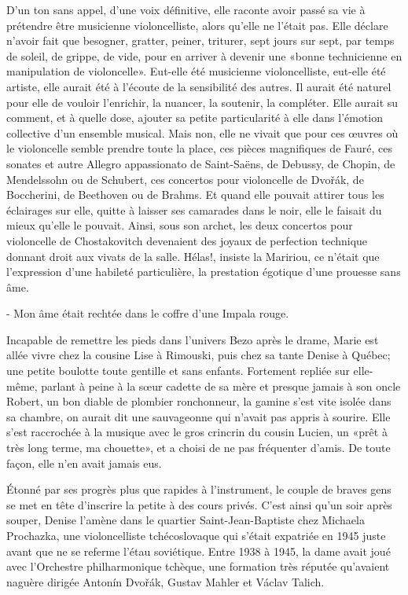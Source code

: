 D’un ton sans appel, d’une voix définitive, elle raconte avoir passé sa vie à prétendre être musicienne violoncelliste, alors qu’elle ne l’était pas. Elle déclare n’avoir fait que besogner, gratter, peiner, triturer, sept jours sur sept, par temps de soleil, de grippe, de vide, pour en arriver à devenir une «bonne technicienne en manipulation de violoncelle». Eut-elle été musicienne violoncelliste, eut-elle été artiste, elle aurait été à l’écoute de la sensibilité des autres. Il aurait été naturel pour elle de vouloir l’enrichir, la nuancer, la soutenir, la compléter. Elle aurait su comment, et à quelle dose, ajouter sa petite particularité à elle dans l’émotion collective d’un ensemble musical. Mais non, elle ne vivait que pour ces œuvres où le violoncelle semble prendre toute la place, ces pièces magnifiques de Fauré, ces sonates et autre Allegro appassionato de Saint-Saëns, de Debussy, de Chopin, de Mendelssohn ou de Schubert, ces concertos pour violoncelle de Dvořák, de Boccherini, de Beethoven ou de Brahms. Et quand elle pouvait attirer tous les éclairages sur elle, quitte à laisser ses camarades dans le noir, elle le faisait du mieux qu’elle le pouvait. Ainsi, sous son archet, les deux concertos pour violoncelle de Chostakovitch devenaient des joyaux de perfection technique donnant droit aux vivats de la salle. Hélas!, insiste la Maririou, ce n’était que l’expression d’une habileté particulière, la prestation égotique d’une prouesse sans âme.

- Mon âme était rechtée dans le coffre d’une Impala rouge.

Incapable de remettre les pieds dans l’univers Bezo après le drame, Marie est allée vivre chez la cousine Lise à Rimouski, puis chez sa tante Denise à Québec; une petite boulotte toute gentille et sans enfants. Fortement repliée sur elle-même, parlant à peine à la sœur cadette de sa mère et presque jamais à son oncle Robert, un bon diable de plombier ronchonneur, la gamine s’est vite isolée dans sa chambre, on aurait dit une sauvageonne qui n’avait pas appris à sourire. Elle s’est raccrochée à la musique avec le gros crincrin du cousin Lucien, un «prêt à très long terme, ma chouette», et a choisi de ne pas fréquenter d’amis. De toute façon, elle n’en avait jamais eus.

Étonné par ses progrès plus que rapides à l’instrument, le couple de braves gens se met en tête d’inscrire la petite à des cours privés. C’est ainsi qu’un soir après souper, Denise l’amène dans le quartier Saint-Jean-Baptiste chez Michaela Prochazka, une violoncelliste tchécoslovaque qui s’était expatriée en 1945 juste avant que ne se referme l’étau soviétique. Entre 1938 à 1945, la dame avait joué avec l’Orchestre philharmonique tchèque, une formation très réputée qu’avaient naguère dirigée Antonín Dvořák, Gustav Mahler et Václav Talich.

